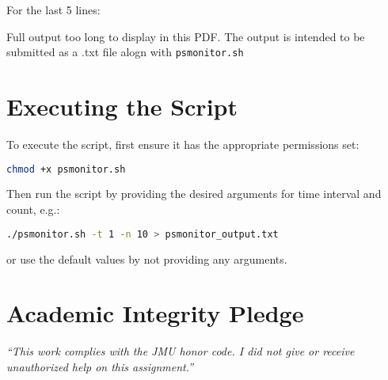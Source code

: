 \documentclass{article}
\begin{document}
For the last 5 lines:


{\color{red}Full output too long to display in this PDF. The output is intended to be submitted as a .txt file alogn with \texttt{psmonitor.sh} }

\section{Executing the Script}
To execute the script, first ensure it has the appropriate permissions set:
\begin{lstlisting}[language=bash]
chmod +x psmonitor.sh
\end{lstlisting}
Then run the script by providing the desired arguments for time interval and count, e.g.:
\begin{lstlisting}[language=bash]
./psmonitor.sh -t 1 -n 10 > psmonitor_output.txt
\end{lstlisting}
 or use the default values by not providing any arguments.
 
 \vfill
  \section*{Academic Integrity Pledge}
    {\color{red}\textit{“This work complies with the JMU honor code. I did not give or receive unauthorized help on this assignment.”}}
\end{document}

